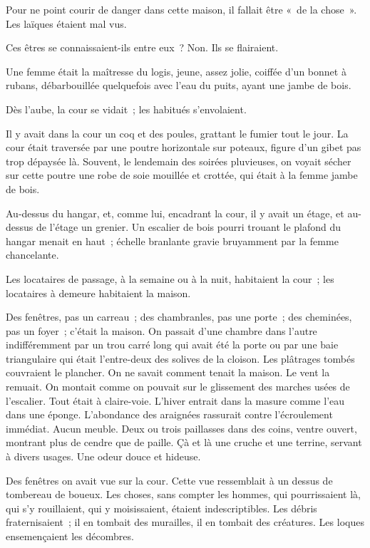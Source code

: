\documentclass[french,twoside]{book} %
\begin{document}
Pour ne point courir de danger dans cette maison, il fallait être « de la chose ». Les laïques étaient mal vus.\par
Ces êtres se connaissaient-ils entre eux ? Non. Ils se flairaient.\par
Une femme était la maîtresse du logis, jeune, assez jolie, coiffée d’un bonnet à rubans, débarbouillée quelquefois avec l’eau du puits, ayant une jambe de bois.\par
Dès l’aube, la cour se vidait ; les habitués s’envolaient.\par
Il y avait dans la cour un coq et des poules, grattant le fumier tout le jour. La cour était traversée par une poutre horizontale sur poteaux, figure d’un gibet pas trop dépaysée là. Souvent, le lendemain des soirées pluvieuses, on voyait sécher sur cette poutre une robe de soie mouillée et crottée, qui était à la femme jambe de bois.\par
Au-dessus du hangar, et, comme lui, encadrant la cour, il y avait un étage, et au-dessus de l’étage un grenier. Un escalier de bois pourri trouant le plafond du hangar menait en haut ; échelle branlante gravie bruyamment par la femme chancelante.\par
Les locataires de passage, à la semaine ou à la nuit, habitaient la cour ; les locataires à demeure habitaient la maison.\par
Des fenêtres, pas un carreau ; des chambranles, pas une porte ; des cheminées, pas un foyer ; c’était la  maison. On passait d’une chambre dans l’autre indifféremment par un trou carré long qui avait été la porte ou par une baie triangulaire qui était l’entre-deux des solives de la cloison. Les plâtrages tombés couvraient le plancher. On ne savait comment tenait la maison. Le vent la remuait. On montait comme on pouvait sur le glissement des marches usées de l’escalier. Tout était à claire-voie. L’hiver entrait dans la masure comme l’eau dans une éponge. L’abondance des araignées rassurait contre l’écroulement immédiat. Aucun meuble. Deux ou trois paillasses dans des coins, ventre ouvert, montrant plus de cendre que de paille. Çà et là une cruche et une terrine, servant à divers usages. Une odeur douce et hideuse.\par
Des fenêtres on avait vue sur la cour. Cette vue ressemblait à un dessus de tombereau de boueux. Les choses, sans compter les hommes, qui pourrissaient là, qui s’y rouillaient, qui y moisissaient, étaient indescriptibles. Les débris fraternisaient ; il en tombait des murailles, il en tombait des créatures. Les loques ensemençaient les décombres.\par
\end{document}
